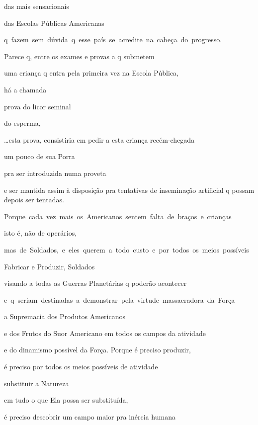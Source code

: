 das mais sensacionais

das Escolas Públicas Americanas

\mbox{q fazem sem dúvida q esse país se acredite na cabeça do progresso.}

Parece q, entre os exames e provas a q submetem

uma criança q entra pela primeira vez na Escola Pública, 

há a chamada

prova do licor seminal

do esperma,


\ldots{}esta prova, consistiria em pedir a esta criança recém-chegada

um pouco de sua Porra

pra ser introduzida numa proveta

e ser mantida assim à disposição pra tentativas de inseminação
artificial q possam depois ser tentadas.


\mbox{Porque cada vez mais os Americanos sentem falta de braços e crianças}

isto é, não de operários, 

\mbox{mas de Soldados, e eles querem a todo custo e por todos os meios possíveis}

Fabricar e Produzir, Soldados

visando a todas as Guerras Planetárias q poderão acontecer

\mbox{e q seriam destinadas a demonstrar pela virtude massacradora da Força}

a Supremacia dos Produtos Americanos

e dos Frutos do Suor Americano em todos os campos da atividade

e do dinamismo possível da Força. Porque é preciso produzir, 

é preciso por todos os meios possíveis de atividade

substituir a Natureza

em tudo o que Ela possa ser substituída,

é preciso descobrir um campo maior pra inércia humana

